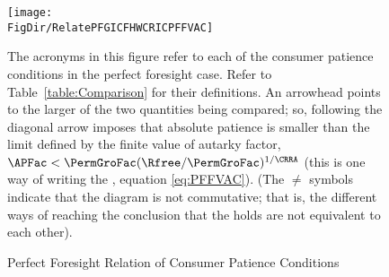 \begin{figure}[ht]
  \centerline{
    \texttt{[image: \\FigDir/RelatePFGICFHWCRICPFFVAC]}
  }
  \caption{Perfect Foresight Relation of Consumer Patience Conditions}
  \label{fig:RelatePFGICFHWCRICPFFVAC}
  \footnotesize{The acronyms in this figure refer to each of the consumer patience conditions in the perfect foresight case. Refer to Table~\ref{table:Comparison} for their definitions. An arrowhead points to the larger of the two quantities being compared; so, following the diagonal arrow imposes that absolute patience is smaller than the limit defined by the finite value of autarky factor, $\APFac < \PermGroFac (\Rfree/\PermGroFac)^{1/\CRRA}$ (this is one way of writing the {\PFFVAC}, equation \eqref{eq:PFFVAC}}). (The $\neq$ symbols indicate that the diagram is not commutative; that is, the different ways of reaching the conclusion that the {\PFFVAC} holds are not equivalent to each other).
\end{figure}
